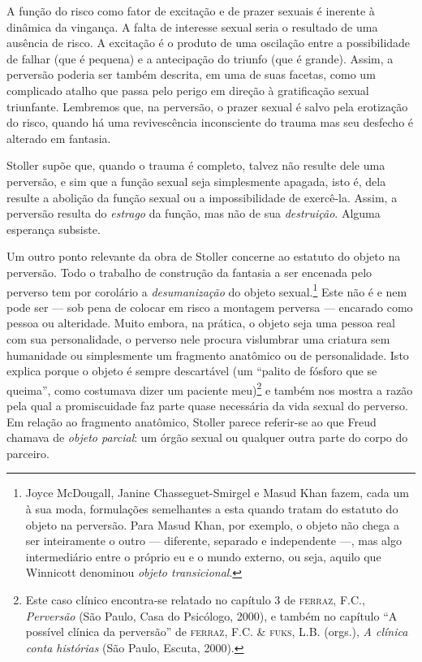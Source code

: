 A função do risco como fator de excitação e de prazer sexuais é inerente
à dinâmica da vingança. A falta de interesse sexual seria o resultado de
uma ausência de risco. A excitação é o produto de uma oscilação entre a
possibilidade de falhar (que é pequena) e a antecipação do triunfo (que
é grande). Assim, a perversão poderia ser também descrita, em uma de
suas facetas, como um complicado atalho que passa pelo perigo em direção
à gratificação sexual triunfante. Lembremos que, na perversão, o prazer
sexual é salvo pela erotização do risco, quando há uma revivescência
inconsciente do trauma mas seu desfecho é alterado em fantasia.

Stoller supõe que, quando o trauma é completo, talvez não resulte dele
uma perversão, e sim que a função sexual seja simplesmente apagada, isto
é, dela resulte a abolição da função sexual ou a impossibilidade de
exercê-la. Assim, a perversão resulta do \emph{estrago} da função, mas
não de sua \emph{destruição}. Alguma esperança subsiste.

Um outro ponto relevante da obra de Stoller concerne ao estatuto do
objeto na perversão. Todo o trabalho de construção da fantasia a ser
encenada pelo perverso tem por corolário a \emph{desumanização} do
objeto sexual.\footnote{Joyce McDougall, Janine Chasseguet-Smirgel e
  Masud Khan fazem, cada um à sua moda, formulações semelhantes a esta
  quando tratam do estatuto do objeto na perversão. Para Masud Khan, por
  exemplo, o objeto não chega a ser inteiramente o outro --- diferente,
  separado e independente ---, mas algo intermediário entre o próprio eu
  e o mundo externo, ou seja, aquilo que Winnicott denominou
  \emph{objeto transicional}.} Este não é e nem pode ser --- sob pena de
colocar em risco a montagem perversa --- encarado como pessoa ou
alteridade. Muito embora, na prática, o objeto seja uma pessoa real com
sua personalidade, o perverso nele procura vislumbrar uma criatura sem
humanidade ou simplesmente um fragmento anatômico ou de personalidade.
Isto explica porque o objeto é sempre descartável (um ``palito de
fósforo que se queima'', como costumava dizer um paciente meu)\footnote{Este
  caso clínico encontra-se relatado no capítulo 3 de \textsc{ferraz},
  F.C., \emph{Perversão} (São Paulo, Casa do Psicólogo, 2000), e também
  no capítulo ``A possível clínica da perversão'' de \textsc{ferraz},
  F.C. \& \textsc{fuks}, L.B. (orgs.), \emph{A clínica conta histórias}
  (São Paulo, Escuta, 2000).} e também nos mostra a razão pela qual a
promiscuidade faz parte quase necessária da vida sexual do perverso. Em
relação ao fragmento anatômico, Stoller parece referir-se ao que Freud
chamava de \emph{objeto parcial}: um órgão sexual ou qualquer outra
parte do corpo do parceiro.

